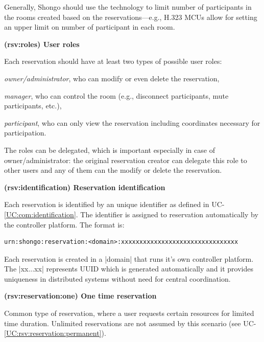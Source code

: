 \documentclass[a4paper]{report}
\makeatletter
\newcounter{UCcounter}
\newenvironment{UseCases}%
	{\begin{list}{\textbf{UC-\arabic{UCcounter}}}{\@nmbrlisttrue\def\@listctr{UCcounter}}}%
	{\end{list}}
\newcommand{\UClabel}[1]{\label{UC:#1}}
\newcommand{\UCref}[1]{UC-\ref{UC:#1}}
\newcommand{\UseCase}[2]{\item\UClabel{#2} \textbf{(#2) #1}\\ \nopagebreak}
\makeatother
\begin{document}
\begin{UseCases}
\begin{compactitem}
\end{compactitem}

Generally, Shongo should use the technology to limit number of participants in
the rooms created based on the reservations---e.g., H.323 MCUs allow for
setting an upper limit on number of participant in each room.

\UseCase{User roles}{rsv:roles}

Each reservation should have at least two types of possible user roles:

\begin{compactitem}

\item \emph{owner/administrator}, who can modify or even delete the reservation,

\item \emph{manager}, who can control the room (e.g., disconnect participants, mute participants, etc.),

\item \emph{participant}, who can only view the reservation including coordinates necessary for participation.

\end{compactitem}

The roles can be delegated, which is important especially in case of owner/administrator: the original reservation creator can delegate this role to other users and any of them can the modify or delete the reservation.


\UseCase{Reservation identification}{rsv:identification}

Each reservation is identified by an unique identifier as defined in \UCref{com:identification}. The identifier is assigned to reservation automatically by the controller platform. The format is:
\begin{verbatim}
urn:shongo:reservation:<domain>:xxxxxxxxxxxxxxxxxxxxxxxxxxxxxxxx
\end{verbatim}
Each reservation is created in a |domain| that runs it's own controller platform.
The |xx...xx| represents UUID \cite{rfc4122} which is generated automatically and it provides uniqueness in distributed systems without need for central coordination.


\UseCase{One time reservation}{rsv:reservation:one}

Common type of reservation, where a user requests certain resources for limited
time duration. Unlimited reservations are not assumed by this scenario (see
\UCref{rsv:reservation:permanent}).


\end{UseCases}
\end{document}

